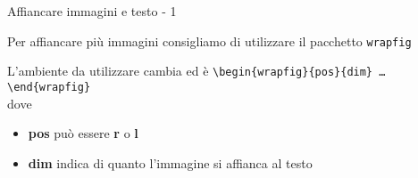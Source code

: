 \begin{frame}{Affiancare immagini e testo - 1}

Per affiancare più immagini consigliamo di utilizzare il pacchetto 
\texttt{wrapfig}

\vfill

L'ambiente da utilizzare cambia ed è
\texttt{\textbackslash{}begin\{wrapfig\}\{pos\}\{dim\}
\dots{}\textbackslash{}end\{wrapfig\}}
\\dove
\begin{itemize}
	\item \textbf{pos} può essere \textbf{r} o \textbf{l}
	\item \textbf{dim} indica di quanto l'immagine si affianca al testo
\end{itemize}

\end{frame}